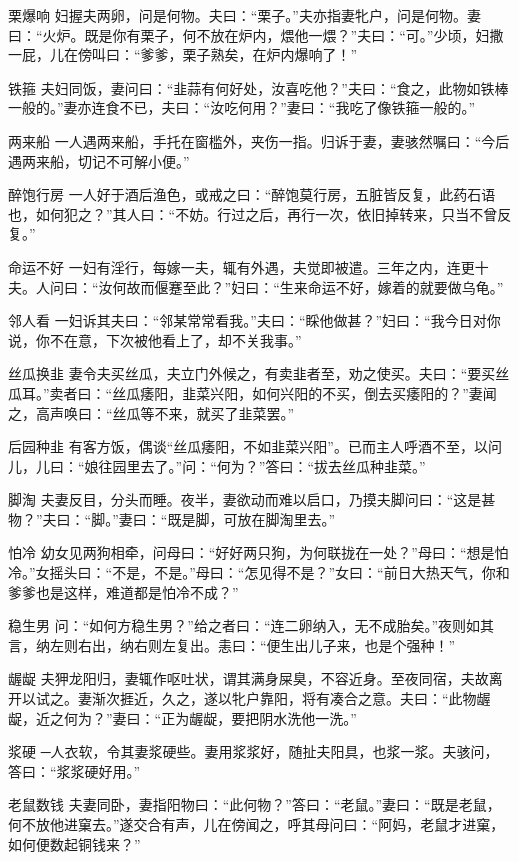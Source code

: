\documentclass[12pt,UTF8]{ctexbook}
\begin{document}
栗爆响
妇握夫两卵，问是何物。夫曰：“栗子。”夫亦指妻牝户，问是何物。妻曰：“火炉。既是你有栗子，何不放在炉内，煨他一煨？”夫曰：“可。”少顷，妇撒一屁，儿在傍叫曰：“爹爹，栗子熟矣，在炉内爆响了！”

铁箍
夫妇同饭，妻问曰：“韭蒜有何好处，汝喜吃他？”夫曰：“食之，此物如铁棒一般的。”妻亦连食不已，夫曰：“汝吃何用？”妻曰：“我吃了像铁箍一般的。”

两来船
一人遇两来船，手托在窗槛外，夹伤一指。归诉于妻，妻骇然嘱曰：“今后遇两来船，切记不可解小便。”

醉饱行房
一人好于酒后渔色，或戒之曰：“醉饱莫行房，五脏皆反复，此药石语也，如何犯之？”其人曰：“不妨。行过之后，再行一次，依旧掉转来，只当不曾反复。”

命运不好
一妇有淫行，每嫁一夫，辄有外遇，夫觉即被遣。三年之内，连更十夫。人问曰：“汝何故而偃蹇至此？”妇曰：“生来命运不好，嫁着的就要做乌龟。”

邻人看
一妇诉其夫曰：“邻某常常看我。”夫曰：“睬他做甚？”妇曰：“我今日对你说，你不在意，下次被他看上了，却不关我事。”

丝瓜换韭
妻令夫买丝瓜，夫立门外候之，有卖韭者至，劝之使买。夫曰：“要买丝瓜耳。”卖者曰：“丝瓜痿阳，韭菜兴阳，如何兴阳的不买，倒去买痿阳的？”妻闻之，高声唤曰：“丝瓜等不来，就买了韭菜罢。”

后园种韭
有客方饭，偶谈“丝瓜痿阳，不如韭菜兴阳”。已而主人呼酒不至，以问儿，儿曰：“娘往园里去了。”问：“何为？”答曰：“拔去丝瓜种韭菜。”

脚淘
夫妻反目，分头而睡。夜半，妻欲动而难以启口，乃摸夫脚问曰：“这是甚物？”夫曰：“脚。”妻曰：“既是脚，可放在脚淘里去。”

怕冷
幼女见两狗相牵，问母曰：“好好两只狗，为何联拢在一处？”母曰：“想是怕冷。”女摇头曰：“不是，不是。”母曰：“怎见得不是？”女曰：“前日大热天气，你和爹爹也是这样，难道都是怕冷不成？”

稳生男
问：“如何方稳生男？”给之者曰：“连二卵纳入，无不成胎矣。”夜则如其言，纳左则右出，纳右则左复出。恚曰：“便生出儿子来，也是个强种！”

龌龊
夫狎龙阳归，妻辄作呕吐状，谓其满身屎臭，不容近身。至夜同宿，夫故离开以试之。妻渐次捱近，久之，遂以牝户靠阳，将有凑合之意。夫曰：“此物龌龊，近之何为？”妻曰：“正为龌龊，要把阴水洗他一洗。”

浆硬
─人衣软，令其妻浆硬些。妻用浆浆好，随扯夫阳具，也浆一浆。夫骇问，答曰：“浆浆硬好用。”

老鼠数钱
夫妻同卧，妻指阳物曰：“此何物？”答曰：“老鼠。”妻曰：“既是老鼠，何不放他进窠去。”遂交合有声，儿在傍闻之，呼其母问曰：“阿妈，老鼠才进窠，如何便数起铜钱来？”
\end{document}
